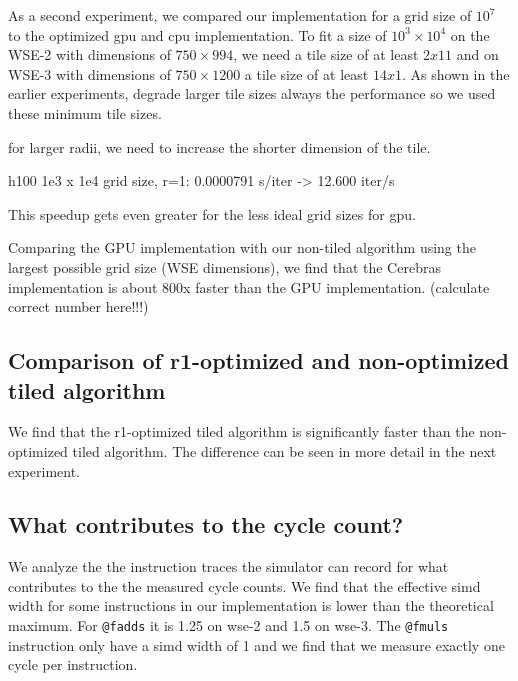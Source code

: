 \documentclass{article}
\begin{document}
As a second experiment, we compared our implementation for a grid size of $10^7$ to the optimized gpu and cpu implementation. To fit a size of $10^3\times10^4$ on the WSE-2 with dimensions of $750\times994$, we need a tile size of at least $2x11$ and on WSE-3 with dimensions of $750\times1200$ a tile size of at least $14x1$. As shown in the earlier experiments, degrade larger tile sizes always the performance so we used these minimum tile sizes.




for larger radii, we need to increase the shorter dimension of the tile.



h100 1e3 x 1e4 grid size, r=1: 0.0000791 s/iter -> 12.600 iter/s





This speedup gets even greater for the less ideal grid sizes for gpu.

Comparing the GPU implementation with our non-tiled algorithm using the largest possible grid size (WSE dimensions), we find that the Cerebras implementation is about 800x faster than the GPU implementation. (calculate correct number here!!!)

\subsection{Comparison of r1-optimized and non-optimized tiled algorithm}
We find that the r1-optimized tiled algorithm is significantly faster than the non-optimized tiled algorithm.
The difference can be seen in more detail in the next experiment.

\subsection{What contributes to the cycle count?}
We analyze the the instruction traces the simulator can record for what contributes to the the measured cycle counts.
We find that the effective simd width for some instructions in our implementation is lower than the theoretical maximum.
For \texttt{@fadds} it is 1.25 on wse-2 and 1.5 on wse-3.
The \texttt{@fmuls} instruction only have a simd width of 1 and we find that we measure exactly one cycle per instruction.
\end{document}
